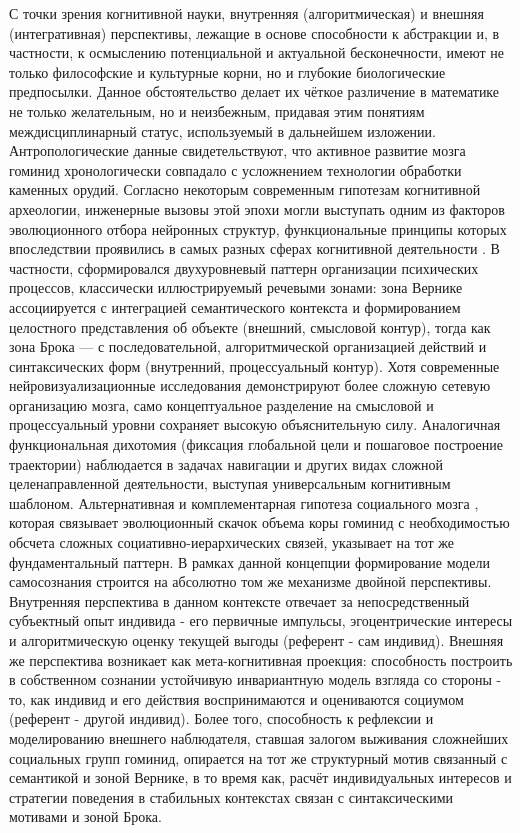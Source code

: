 \documentclass[12pt]{article}
\begin{document}
С точки зрения когнитивной науки, внутренняя (алгоритмическая) и внешняя (интегративная) перспективы, лежащие в основе способности к абстракции и, в частности, к осмыслению потенциальной и актуальной бесконечности, имеют не только философские и культурные корни, но и глубокие биологические предпосылки. Данное обстоятельство делает их чёткое различение в математике не только желательным, но и неизбежным, придавая этим понятиям междисциплинарный статус, используемый в дальнейшем изложении. Антропологические данные свидетельствуют, что активное развитие мозга гоминид хронологически совпадало с усложнением технологии обработки каменных орудий. Согласно некоторым современным гипотезам когнитивной археологии, инженерные вызовы этой эпохи могли выступать одним из факторов эволюционного отбора нейронных структур, функциональные принципы которых впоследствии проявились в самых разных сферах когнитивной деятельности \cite{antropology-infinity}. В частности, сформировался двухуровневый паттерн организации психических процессов, классически иллюстрируемый речевыми зонами: зона Вернике ассоциируется с интеграцией семантического контекста и формированием целостного представления об объекте (внешний, смысловой контур), тогда как зона Брока — с последовательной, алгоритмической организацией действий и синтаксических форм (внутренний, процессуальный контур). Хотя современные нейровизуализационные исследования демонстрируют более сложную сетевую организацию мозга, само концептуальное разделение на смысловой и процессуальный уровни сохраняет высокую объяснительную силу. Аналогичная функциональная дихотомия (фиксация глобальной цели и пошаговое построение траектории) наблюдается в задачах навигации и других видах сложной целенаправленной деятельности, выступая универсальным когнитивным шаблоном. Альтернативная и комплементарная гипотеза социального мозга \cite{antropology-socium}, которая связывает эволюционный скачок объема коры гоминид с необходимостью обсчета сложных социативно-иерархических связей, указывает на тот же фундаментальный паттерн. В рамках данной концепции формирование модели самосознания строится на абсолютно том же механизме двойной перспективы. Внутренняя перспектива в данном контексте отвечает за непосредственный субъектный опыт индивида - его первичные импульсы, эгоцентрические интересы и алгоритмическую оценку текущей выгоды (референт - сам индивид). Внешняя же перспектива возникает как мета-когнитивная проекция: способность построить в собственном сознании устойчивую инвариантную модель взгляда со стороны - то, как индивид и его действия воспринимаются и оцениваются социумом (референт - другой индивид). Более того, способность к рефлексии и моделированию внешнего наблюдателя, ставшая залогом выживания сложнейших социальных групп гоминид, опирается на тот же структурный мотив связанный с семантикой и зоной Вернике, в то время как, расчёт индивидуальных интересов и стратегии поведения в стабильных контекстах связан с синтаксическими мотивами и зоной Брока. 
\end{document}
